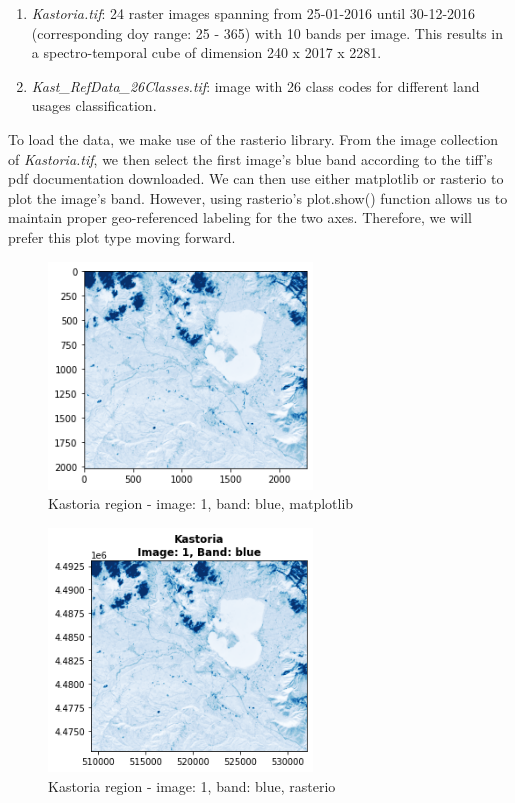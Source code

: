 \begin{enumerate}
  \item \emph{Kastoria.tif}: 24 raster images spanning from 25-01-2016 until 30-12-2016 (corresponding doy range: 25 - 365) with 10 bands per image. This results in a spectro-temporal cube of dimension 240 x 2017 x 2281.
  \item \emph{Kast\_RefData\_26Classes.tif}:  image with 26 class codes for different land usages classification.
\end{enumerate}

To load the data, we make use of the rasterio library. From the image collection of \emph{Kastoria.tif}, we then select the first image's blue band according to the tiff's pdf documentation downloaded. We can then use either matplotlib or rasterio to plot the image's band. However, using rasterio's plot.show() function allows us to maintain proper geo-referenced labeling for the two axes. Therefore, we will prefer this plot type moving forward.

\begin{figure}[h]
    \centering
    \includegraphics[width=7cm]{figures/q2_1_matplotlib_image1_blue_band.png}
    \caption{Kastoria region - image: 1, band: blue, matplotlib}
    \label{fig:Kastoria region - image: 1, band: blue, matplotlib}
\end{figure}
\FloatBarrier %

\begin{figure}[h]
    \centering
    \includegraphics[width=7cm]{figures/q2_1_rasterio_image1_blue_band.png}
    \caption{Kastoria region - image: 1, band: blue, rasterio}
    \label{fig:Kastoria region - image: 1, band: blue, rasterio}
\end{figure}
\FloatBarrier %


